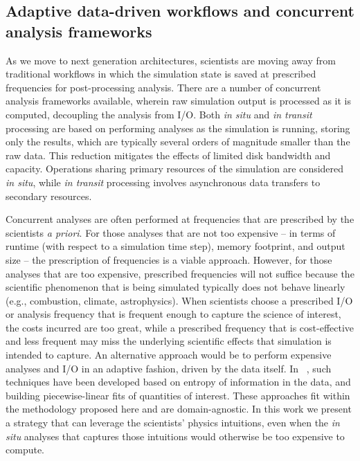 \documentclass[final]{siamltex}
\begin{document}
\subsection{Adaptive data-driven workflows  and concurrent analysis frameworks}
\label{sec:enabling}
As we move to next generation architectures, scientists are moving away from traditional workflows in
which the simulation state is saved at prescribed frequencies for
post-processing analysis.  There are a number of concurrent analysis frameworks
available, wherein raw simulation output is processed as it is computed, decoupling the analysis from I/O. 
Both \emph{in situ} \cite{Yu2010,visit:2011, paraview:ldav11}  and 
\emph{in transit}  \cite{glean:ldav11, JITStaging, Bennett:2012} processing are based on  
performing analyses as the simulation is running, storing only the results, which are typically  several orders 
of magnitude smaller than the raw data. This reduction mitigates the effects of limited disk bandwidth and
capacity. Operations sharing primary resources of the simulation are considered
\emph{in situ}, while \emph{in transit} 
processing involves asynchronous data transfers to secondary resources. 

Concurrent analyses are often performed at frequencies that are prescribed by the scientists \emph{a
priori}.  For those analyses that are not too expensive -- in terms of runtime
(with respect to a simulation time step), memory footprint, and output size -- 
the prescription of frequencies is a viable approach.  However, for those analyses 
that are too expensive, prescribed frequencies will not suffice because the 
scientific phenomenon that is being simulated typically does not behave linearly (e.g., combustion, climate,
astrophysics).  When scientists choose a prescribed I/O or analysis frequency 
that is frequent enough to capture the science of interest, the costs incurred are 
too great, while a prescribed frequency that is cost-effective and less
frequent may miss the underlying scientific effects that simulation is intended to capture.
An alternative approach would be to perform expensive analyses and I/O in an
adaptive fashion, driven by the data itself.  In ~\cite{nouanesengsy2014adr,
modelPaper}, such techniques have been developed based on entropy of
information in the data, and building piecewise-linear fits of quantities of
interest.  These approaches fit within the methodology proposed here and are domain-agnostic.
In this work we present a strategy that can leverage the scientists' physics
intuitions, even when the \emph{in situ} analyses that captures those
intuitions would otherwise be too expensive to compute. 
\end{document}
